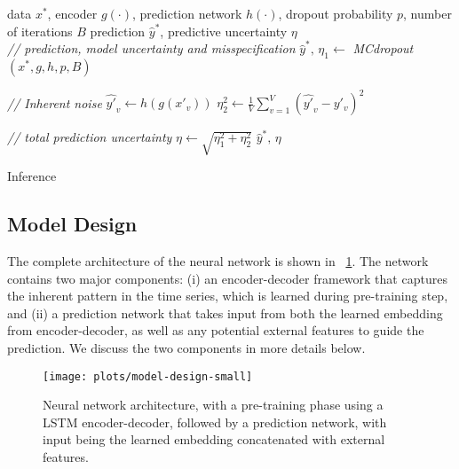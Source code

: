 \documentclass[conference,compsoc,final]{IEEEtran}
\begin{document}
\begin{algorithm}[H]

 \begin{algorithmic}[1]
 \renewcommand{\algorithmicrequire}{\textbf{Input:}}
 \renewcommand{\algorithmicensure}{\textbf{Output:}}
 \REQUIRE data $x^*$, encoder $g(\cdot)$, prediction network $h(\cdot)$, dropout probability $p$, number of iterations $B$
 \ENSURE prediction $\hat{y}^*$, predictive uncertainty $\eta$
 \\
 \vspace{3pt}
  \textit{// prediction, model uncertainty and misspecification}
   \STATE $\hat{y}^*, \, \eta_1 \leftarrow$ {\it MCdropout} $(x^*, g, h, p, B)$
   
    \vspace{3pt}
 \textit{// Inherent noise}
  \STATE $\hat{y'}_v \leftarrow h(g(x'_v))$
  \ENDFOR
  \STATE $\eta_2^2 \leftarrow \frac{1}{V} \sum_{v=1}^V \left( \hat{y'}_v - y'_v \right)^2$

\vspace{3pt}
 \textit{// total prediction uncertainty}
 \STATE $\eta \leftarrow \sqrt{\eta_1^2 + \eta_2^2}$
 \RETURN $\hat{y}^*, \, \eta$
 \end{algorithmic}
 \caption{Inference}
 \label{algo:inference}
 \end{algorithm}



\subsection{Model Design}
\label{sec:model-design}

The complete architecture of the neural network is shown in \figurename~\ref{fig:model}. The network contains two major components: (i) an encoder-decoder framework that captures the inherent pattern in the time series, which is learned during pre-training step, and (ii) a prediction network that takes input from both the learned embedding from encoder-decoder, as well as any potential external features to guide the prediction. We discuss the two components in more details below.

\begin{figure}[!t]
\centering
\texttt{[image: plots/model-design-small]}
\caption{Neural network architecture, with a pre-training phase using a LSTM encoder-decoder, followed by a prediction network, with input being the learned embedding concatenated with external features.}
\label{fig:model}
\end{figure}
\end{document}
